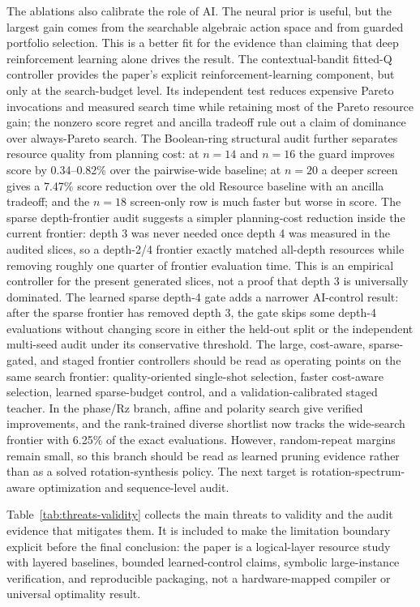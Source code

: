 \documentclass[11pt]{article}
\begin{document}
The ablations also calibrate the role of AI.  The neural prior is useful, but
the largest gain comes from the searchable algebraic action space and from
guarded portfolio selection.  This is a better fit for the evidence than
claiming that deep reinforcement learning alone drives the result.  The
contextual-bandit fitted-Q controller provides the paper's explicit
reinforcement-learning component, but only at the search-budget level.  Its
independent test reduces expensive Pareto invocations and measured search time
while retaining most of the Pareto resource gain; the nonzero score regret and
ancilla tradeoff rule out a claim of dominance over always-Pareto search.  The
Boolean-ring structural audit further separates resource quality from planning
cost: at $n=14$ and $n=16$ the guard improves score by 0.34--0.82\% over the
pairwise-wide baseline; at $n=20$ a deeper screen gives a 7.47\% score
reduction over the old Resource baseline with an ancilla tradeoff; and the
$n=18$ screen-only row is much faster but worse in score.  The sparse
depth-frontier audit suggests a simpler planning-cost reduction inside the
current frontier: depth 3 was never needed once depth 4 was measured in the
audited slices, so a depth-2/4 frontier exactly matched all-depth resources
while removing roughly one quarter of frontier evaluation time.  This is an
empirical controller for the present generated slices, not a proof that depth 3
is universally dominated.  The learned sparse depth-4 gate adds a narrower
AI-control result: after the sparse frontier has removed depth 3, the gate
skips some depth-4 evaluations without changing score in either the held-out
split or the independent multi-seed audit under its conservative threshold.
The large, cost-aware, sparse-gated, and staged frontier controllers should be
read as operating points on the same search frontier: quality-oriented
single-shot selection, faster cost-aware selection, learned sparse-budget
control, and a validation-calibrated staged teacher.  In the
phase/Rz branch, affine and polarity search give verified improvements, and the
rank-trained diverse shortlist now tracks the wide-search frontier with 6.25\%
of the exact evaluations.  However, random-repeat margins remain small, so this
branch should be read as learned pruning evidence rather than as a solved
rotation-synthesis policy.  The next target is rotation-spectrum-aware
optimization and sequence-level audit.

Table~\ref{tab:threats-validity} collects the main threats to validity and the
audit evidence that mitigates them.  It is included to make the limitation
boundary explicit before the final conclusion: the paper is a logical-layer
resource study with layered baselines, bounded learned-control claims,
symbolic large-instance verification, and reproducible packaging, not a
hardware-mapped compiler or universal optimality result.
\end{document}
